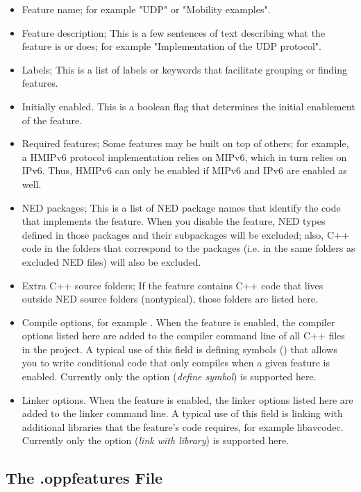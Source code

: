 \begin{itemize}
  \item{Feature name; for example "UDP" or "Mobility examples".}
  \item{Feature description; This is a few sentences of text describing what the feature
    is or does; for example "Implementation of the UDP protocol".}
  \item{Labels; This is a list of labels or keywords that facilitate grouping or finding features.}
  \item{Initially enabled. This is a boolean flag that determines the initial enablement
    of the feature.}
\item{Required features; Some features may be built on top of others; for example, a HMIPv6
    protocol implementation relies on MIPv6, which in turn relies on IPv6. Thus, HMIPv6 can
    only be enabled if MIPv6 and IPv6 are enabled as well.}
\item{NED packages; This is a list of NED package names that identify the code that implements
    the feature. When you disable the feature, NED types defined in those packages and their
    subpackages will be excluded; also, C++ code in the folders that correspond to the packages
    (i.e. in the same folders as excluded NED files) will also be excluded.}
\item{Extra C++ source folders; If the feature contains C++ code that lives outside NED source
    folders (nontypical), those folders are listed here.}
\item{Compile options, for example . When the feature is enabled, the compiler
    options listed here are added to the compiler command line of all C++ files in the project.
    A typical use of this field is defining symbols () that allows you to write conditional code
    that only compiles when a given feature is enabled. Currently only the  option
    (\textit{define symbol}) is supported here.}
\item{Linker options. When the feature is enabled, the linker options listed here are added
    to the linker command line. A typical use of this field is linking with additional
    libraries that the feature's code requires, for example libavcodec.
    Currently only the  option (\textit{link with library}) is supported here.}
\end{itemize}

\subsection{The .oppfeatures File}
\label{sec:build-sim-progs:oppfeatures-file}

